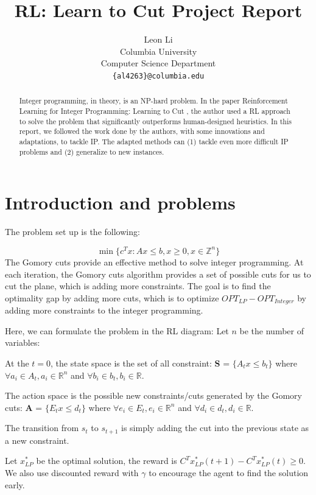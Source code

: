 \documentclass{article}
\title{RL: Learn to Cut Project Report
}
\author{
  Leon Li \\
  Columbia University \\
  Computer Science Department\\
  \texttt{\{al4263\}@columbia.edu} \\
}
\begin{document}
\maketitle


\begin{abstract}
Integer programming, in theory, is an NP-hard problem. In the paper Reinforcement Learning for Integer Programming: Learning to Cut \cite{rlcut}, the author used a RL approach to solve the problem that significantly outperforms human-designed heuristics. In this report, we followed the work done by the authors, with some innovations and adaptations, to tackle IP. The adapted methods can (1) tackle even more difficult IP problems and (2) generalize to new instances.
\end{abstract}





\section{Introduction and problems}
The problem set up is the following:

\[  \min \{c^Tx : Ax \leq b,x\geq0, x\in \mathbb{Z}^n \} \]
The Gomory cuts provide an effective method to solve integer programming. At each iteration, the Gomory cuts algorithm provides a set of possible cuts for us to cut the plane, which is adding more constraints. The goal is to find the optimality gap by adding more cuts, which is to optimize $OPT_{LP} - OPT_{Integer}$ \cite{lecture} by adding more constraints to the integer programming.

Here, we can formulate the problem in the RL diagram: 
Let $n$ be the number of variables:

At the $t = 0$, the state space is the set of all constraint: \textbf{S} = $\{A_t x \leq b_t \}$ where $\forall a_i \in A_t, a_i \in \mathbb{R}^n$ and  $\forall b_i \in b_t, b_i \in \mathbb{R}$.

The action space is the possible new constraints/cuts generated by the Gomory cuts: \textbf{A} =  $\{E_t x \leq d_t \}$ where $\forall e_i \in E_t, e_i \in \mathbb{R}^n$ and  $\forall d_i \in d_t, d_i \in \mathbb{R}$.

The transition from $s_t$ to $s_{t+1}$ is simply adding the cut into the previous state as a new constraint.

Let $x^*_{LP}$ be the optimal solution, the reward is $C^T x^*_{LP}(t+1) - C^T x^*_{LP}(t) \geq 0.$ We also use discounted reward with $\gamma$ to encourage the agent to find the solution early.
\end{document}
